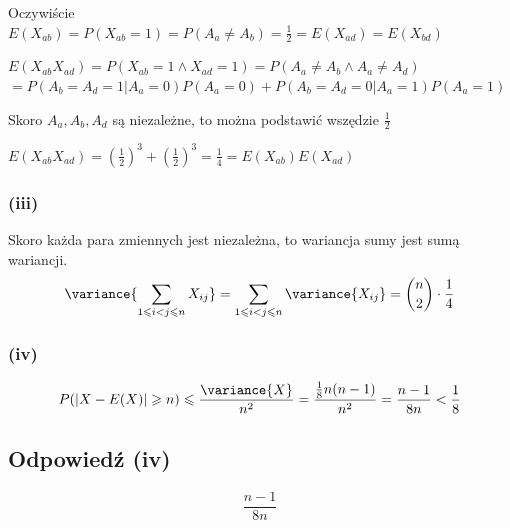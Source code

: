 Oczywiście
\(E(X_{ab}) = P(X_{ab} = 1) = P(A_a \neq A_b) = \frac{1}{2}
= E(X_{ad}) = E(X_{bd})\)

\(E(X_{ab}X_{ad}) = P(X_{ab} = 1 \land X_{ad} = 1) = P(A_a \neq A_b \land
A_a \neq A_d)\)\\
\(= P(A_b = A_d = 1 | A_a = 0)P(A_a = 0) + P(A_b = A_d = 0 | A_a = 1)P(A_a = 1)
\)

Skoro \(A_a, A_b, A_d\) są niezależne, to można podstawić wszędzie
\(\frac{1}{2}\)

\(E(X_{ab}X_{ad}) = \left(\frac{1}{2}\right)^3
+ \left(\frac{1}{2}\right)^3 = \frac{1}{4}
= E(X_{ab})E(X_{ad})
\)

\subsubsection*{(iii)}
Skoro każda para zmiennych jest niezależna, to wariancja sumy jest
sumą wariancji.
\[\variance{\sum_{1\leqslant i < j \leqslant n} X_{ij}}
	= \sum_{1\leqslant i < j \leqslant n} \variance{X_{ij}}
	= \binom{n}{2} \cdot \frac{1}{4}
\]

\subsubsection*{(iv)}
\[
	P(|X-E(X)|\geqslant n) \leqslant \frac{\variance{X}}{n^2}
	= \frac{\frac{1}{8}n(n-1)}{n^2} = \frac{n-1}{8n} < \frac{1}{8}
\]

\subsection*{Odpowiedź (iv)}
\[
	\boxed{\frac{n-1}{8n}}
\]
